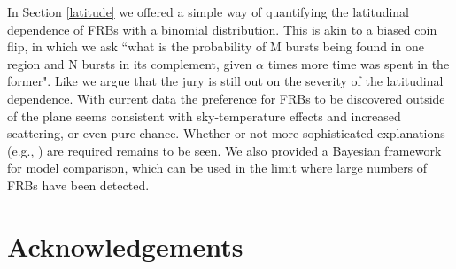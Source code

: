 \documentclass[useAMS,usenatbib]{mn2e}
\begin{document}
In Section \ref{latitude} we offered a simple way of quantifying the 
latitudinal dependence of FRBs with a binomial distribution. This 
is akin to a biased coin flip, in which we ask ``what is the probability of 
M bursts being found in one region and N bursts in its complement, given 
$\alpha$ times more time was spent in the former". Like \cite{2015arXiv150500834R} we argue
that the jury is still out on the severity of the latitudinal 
dependence. With current data the preference for FRBs to 
be discovered outside of the plane seems consistent with
sky-temperature effects and increased scattering, or even pure chance. 
Whether or not more sophisticated explanations 
(e.g., \citealt{2015MNRAS.451.3278M}) are required remains to be seen. 
We also provided a Bayesian framework for model comparison,
which can be used in the limit where large numbers of FRBs have
been detected. 

\section{Acknowledgements}


\newcommand{\araa}{ARA\&A}   %
\newcommand{\afz}{Afz}       %
\newcommand{\aj}{AJ}         %
\newcommand{\azh}{AZh}       %
\newcommand{\aaa}{A\&A}      %
\newcommand{\aas}{A\&AS}     %
\newcommand{\aar}{A\&AR}     %
\newcommand{\apj}{ApJ}       %
\newcommand{\apjs}{ApJS}     %
\newcommand{\apjl}{ApJ}      %
\newcommand{\apss}{Ap\&SS}   %
\newcommand{\baas}{BAAS}     %
\newcommand{\jaa}{JA\&A}     %
\newcommand{\mnras}{MNRAS}   %
\newcommand{\nat}{Nat}       %
\newcommand{\pasj}{PASJ}     %
\newcommand{\pasp}{PASP}     %
\newcommand{\paspc}{PASPC}   %
\newcommand{\qjras}{QJRAS}   %
\newcommand{\sci}{Sci}       %
\newcommand{\solphys}{Solar Physics}       %
\newcommand{\sova}{SvA}      %
\newcommand{\aap}{A\&A}
\newcommand\jcap{{J. Cosmology Astropart. Phys.}}%
\newcommand{\prd}{Phys. Rev. D}

%




\label{lastpage}
\end{document}
